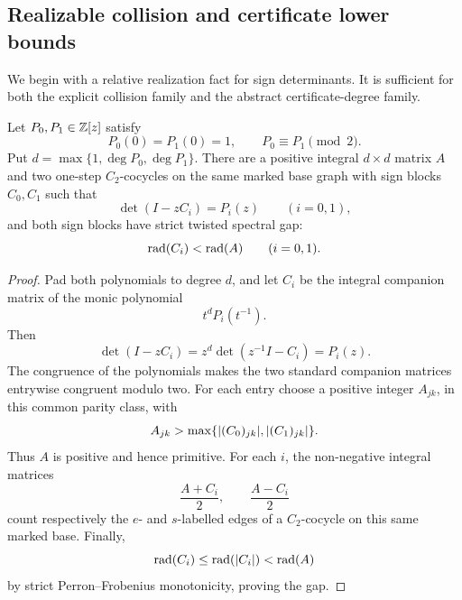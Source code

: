 \subsection{Realizable collision and certificate lower bounds}
\label{sec:realizable-collision-lower-bounds}

We begin with a relative realization fact for sign determinants.  It is
sufficient for both the explicit collision family and the abstract
certificate-degree family.

\begin{lemma}
\label{lem:relative-sign-determinant-realization}
Let \(P_0,P_1\in\mathbb{Z}[z]\) satisfy
\[
 P_0(0)=P_1(0)=1,\qquad P_0\equiv P_1\pmod2.
\]
Put \(d=\max\{1,\deg P_0,\deg P_1\}\).  There are a positive integral
\(d\times d\) matrix \(A\) and two one-step \(C_2\)-cocycles on the same
marked base graph with sign blocks \(C_0,C_1\) such that
\[
 \det(I-zC_i)=P_i(z)\qquad(i=0,1),
\]
and both sign blocks have strict twisted spectral gap:
\[
 \operatorname{rad}(C_i)<\operatorname{rad}(A)\qquad(i=0,1).
\]
\end{lemma}

\begin{proof}
Pad both polynomials to degree \(d\), and let \(C_i\) be the integral
companion matrix of the monic polynomial
\[
 t^dP_i(t^{-1}).
\]
Then
\[
 \det(I-zC_i)=z^d\det(z^{-1}I-C_i)=P_i(z).
\]
The congruence of the polynomials makes the two standard companion matrices
entrywise congruent modulo two.  For each entry choose a positive integer
\(A_{jk}\), in this common parity class, with
\[
 A_{jk}>\max\{\lvert (C_0)_{jk} \rvert,\lvert (C_1)_{jk} \rvert\}.
\]
Thus \(A\) is positive and hence primitive.  For each \(i\), the non-negative
integral matrices
\[
 \frac{A+C_i}{2},\qquad \frac{A-C_i}{2}
\]
count respectively the \(e\)- and \(s\)-labelled edges of a \(C_2\)-cocycle
on this same marked base.  Finally,
\[
 \operatorname{rad}(C_i)\le\operatorname{rad}(\lvert C_i \rvert)<\operatorname{rad}(A)
\]
by strict Perron--Frobenius monotonicity, proving the gap.
\end{proof}

